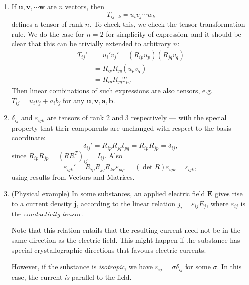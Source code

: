 \documentclass[a4paper]{article}
\begin{document}
\begin{eg}\leavevmode
  \begin{enumerate}
    \item If $\mathbf{u}, \mathbf{v}, \cdots\mathbf{w}$ are $n$ vectors, then
      \[
        T_{ij\cdots k} =u_i v_j \cdots w_k
      \]
      defines a tensor of rank $n$. To check this, we check the tensor transformation rule. We do the case for $n = 2$ for simplicity of expression, and it should be clear that this can be trivially extended to arbitrary $n$:
      \begin{align*}
        T_{ij}' &= u_i'v_j' = (R_{ip} u_p)(R_{jq}v_q)\\
        &= R_{ip}R_{jq}(u_p v_q)\\
        &= R_{ip}R_{jq}T_{pq}
      \end{align*}
      Then linear combinations of such expressions are also tensors, e.g.\ $T_{ij} = u_i v_j + a_ib_j$ for any $\mathbf{u}, \mathbf{v}, \mathbf{a},\mathbf{b}$.
    \item $\delta_{ij}$ and $\varepsilon_{ijk}$ are tensors of rank 2 and 3 respectively --- with the special property that their components are unchanged with respect to the basis coordinate:
      \[
        \delta_{ij}' = R_{ip}R_{jq}\delta_{pq} = R_{ip}R_{jp} = \delta_{ij},
      \]
      since $R_{ip}R_{jp} = (RR^T)_{ij} = I_{ij}$. Also
      \[
        \varepsilon_{ijk}' = R_{ip}R_{jq}R_{kr}\varepsilon_{pqr} = (\det R)\varepsilon_{ijk} = \varepsilon_{ijk},
      \]
      using results from Vectors and Matrices.
    \item (Physical example) In some substances, an applied electric field $\mathbf{E}$ gives rise to a current density $\mathbf{j}$, according to the linear relation $j_i = \varepsilon_{ij} E_j$, where $\varepsilon_{ij}$ is the \emph{conductivity tensor}.

      Note that this relation entails that the resulting current need not be in the same direction as the electric field. This might happen if the substance has special crystallographic directions that favours electric currents.

      However, if the substance is \emph{isotropic}, we have $\varepsilon_{ij} = \sigma\delta_{ij}$ for some $\sigma$. In this case, the current \emph{is} parallel to the field.
  \end{enumerate}
\end{eg}
\end{document}
